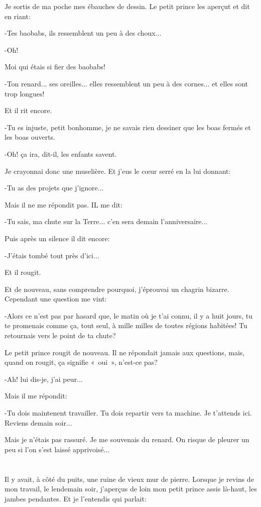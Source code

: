 \documentclass{report}
\newcommand{\parachapter}[2][]{\end{paracol}\chapter[#1]{#2}\begin{paracol}{2}}
\begin{document}
\begin{paracol}{2}
Je sortis de ma poche mes ébauches de dessin. Le petit prince les aperçut et dit en riant:

-Tes baobabs, ils ressemblent un peu à des choux...

-Oh!

Moi qui étais si fier des baobabs!

-Ton renard... ses oreilles... elles ressemblent un peu à des cornes... et elles sont trop longues!

Et il rit encore.

-Tu es injuste, petit bonhomme, je ne savais rien dessiner que les boas fermés et les boas ouverts.

-Oh! ça ira, dit-il, les enfants savent.

Je crayonnai donc une muselière. Et j'eus le cœur serré en la lui donnant:

-Tu as des projets que j'ignore...

Mais il ne me répondit pas. IL me dit:

-Tu sais, ma chute sur la Terre... c'en sera demain l'anniversaire...

Puis après un silence il dit encore:

-J'étais tombé tout près d'ici...

Et il rougit.

Et de nouveau, sans comprendre pourquoi, j'éprouvai un chagrin bizarre. Cependant une question me vint:

-Alors ce n'est pas par hasard que, le matin où je t'ai connu, il y a huit jours, tu te promenais comme ça, tout seul, à mille milles de toutes régions habitées! Tu retournais vers le point de ta chute?

Le petit prince rougit de nouveau. Il ne répondait jamais aux questions, mais, quand on rougit, ça signifie «~oui~», n'est-ce pas?

-Ah! lui dis-je, j'ai peur...

Mais il me répondit:

-Tu dois maintenent travailler. Tu dois repartir vers ta machine. Je t'attends ici. Reviens demain soir...

Mais je n'étais pas rassuré. Je me souvenais du renard. On risque de pleurer un peu si l'on s'est laissé apprivoisé...

\parachapter{} %
Il y avait, à côté du puits, une ruine de vieux mur de pierre. Lorsque je revins de mon travail, le lendemain soir, j'aperçus de loin mon petit prince assis là-haut, les jambes pendantes. Et je l'entendis qui parlait:


\end{paracol}
\end{document}
